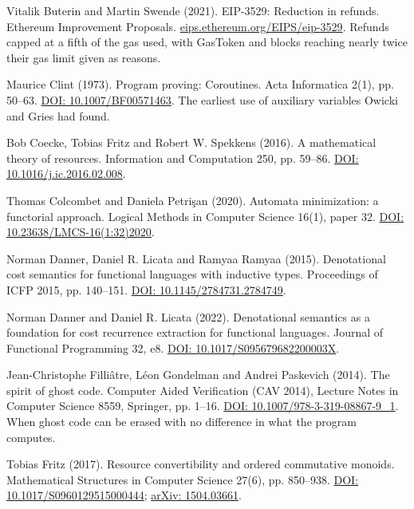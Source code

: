 \noindent Vitalik Buterin and Martin Swende (2021). EIP-3529: Reduction in refunds. Ethereum Improvement Proposals. \href{https://eips.ethereum.org/EIPS/eip-3529}{eips.ethereum.org/EIPS/eip-3529}. Refunds capped at a fifth of the gas used, with GasToken and blocks reaching nearly twice their gas limit given as reasons.
\par\medskip

\noindent Maurice Clint (1973). Program proving: Coroutines. Acta Informatica 2(1), pp. 50--63. \href{https://doi.org/10.1007/BF00571463}{DOI: 10.1007/BF00571463}. The earliest use of auxiliary variables Owicki and Gries had found.
\par\medskip

\noindent Bob Coecke, Tobias Fritz and Robert W. Spekkens (2016). A mathematical theory of resources. Information and Computation 250, pp. 59--86. \href{https://doi.org/10.1016/j.ic.2016.02.008}{DOI: 10.1016/j.ic.2016.02.008}.
\par\medskip

\noindent Thomas Colcombet and Daniela Petri\c{s}an (2020). Automata minimization: a functorial approach. Logical Methods in Computer Science 16(1), paper 32. \href{https://doi.org/10.23638/LMCS-16(1:32)2020}{DOI: 10.23638/LMCS-16(1:32)2020}.
\par\medskip

\noindent Norman Danner, Daniel R. Licata and Ramyaa Ramyaa (2015). Denotational cost semantics for functional languages with inductive types. Proceedings of ICFP 2015, pp. 140--151. \href{https://doi.org/10.1145/2784731.2784749}{DOI: 10.1145/2784731.2784749}.
\par\medskip

\noindent Norman Danner and Daniel R. Licata (2022). Denotational semantics as a foundation for cost recurrence extraction for functional languages. Journal of Functional Programming 32, e8. \href{https://doi.org/10.1017/S095679682200003X}{DOI: 10.1017/S095679682200003X}.
\par\medskip

\noindent Jean-Christophe Filli\^atre, L\'eon Gondelman and Andrei Paskevich (2014). The spirit of ghost code. Computer Aided Verification (CAV 2014), Lecture Notes in Computer Science 8559, Springer, pp. 1--16. \href{https://doi.org/10.1007/978-3-319-08867-9_1}{DOI: 10.1007/978-3-319-08867-9\_1}. When ghost code can be erased with no difference in what the program computes.
\par\medskip

\noindent Tobias Fritz (2017). Resource convertibility and ordered commutative monoids. Mathematical Structures in Computer Science 27(6), pp. 850--938. \href{https://doi.org/10.1017/S0960129515000444}{DOI: 10.1017/S0960129515000444}; \href{https://arxiv.org/abs/1504.03661}{arXiv: 1504.03661}.
\par\medskip

